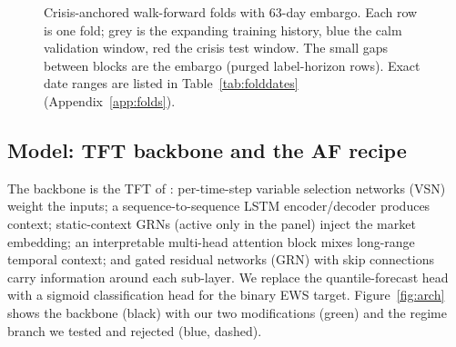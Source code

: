 \documentclass[11pt,a4paper]{article}
\begin{document}
\begin{figure}[t]
\centering
{}
\caption{Crisis-anchored walk-forward folds with 63-day embargo. Each row is
one fold; grey is the expanding training history, blue the calm validation
window, red the crisis test window. The small gaps between blocks are the
embargo (purged label-horizon rows). Exact date ranges are listed in
Table~\ref{tab:folddates} (Appendix~\ref{app:folds}).}
\label{fig:cv}
\end{figure}

\subsection{Model: TFT backbone and the AF recipe}
\label{sec:method-model}
The backbone is the TFT of \citet{lim2021tft}: per-time-step variable
selection networks (VSN) weight the inputs; a sequence-to-sequence LSTM
encoder/decoder produces context; static-context GRNs (active only in the
panel) inject the market embedding; an interpretable multi-head attention
block mixes long-range temporal context; and gated residual networks (GRN)
with skip connections carry information around each sub-layer. We replace the
quantile-forecast head with a sigmoid classification head for the binary EWS
target. Figure~\ref{fig:arch} shows the backbone (black) with our two
modifications (green) and the regime branch we tested and rejected (blue,
dashed).
\end{document}
